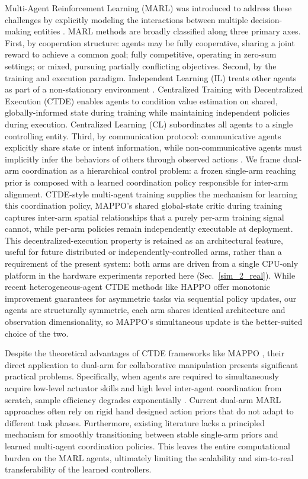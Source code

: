 \documentclass[a4paper,fleqn]{cas-dc}
\begin{document}
Multi-Agent Reinforcement Learning (MARL) was introduced to address these challenges by explicitly modeling the interactions between multiple decision-making entities \cite{intro-22}. MARL methods are broadly classified along three primary axes. First, by cooperation structure: agents may be fully cooperative, sharing a joint reward to achieve a common goal; fully competitive, operating in zero-sum settings; or mixed, pursuing partially conflicting objectives. Second, by the training and execution paradigm. Independent Learning (IL) treats other agents as part of a non-stationary environment \cite{IPPO}. Centralized Training with Decentralized Execution (CTDE) enables agents to condition value estimation on shared, globally-informed state during training while maintaining independent policies during execution. Centralized Learning (CL) subordinates all agents to a single controlling entity. Third, by communication protocol: communicative agents explicitly share state or intent information, while non-communicative agents must implicitly infer the behaviors of others through observed actions \cite{intro-23, intro-25}. We frame dual-arm coordination as a hierarchical control problem: a frozen single-arm reaching prior is composed with a learned coordination policy responsible for inter-arm alignment. CTDE-style multi-agent training supplies the mechanism for learning this coordination policy, MAPPO's shared global-state critic during training captures inter-arm spatial relationships that a purely per-arm training signal cannot, while per-arm policies remain independently executable at deployment. This decentralized-execution property is retained as an architectural feature, useful for future distributed or independently-controlled arms, rather than a requirement of the present system: both arms are driven from a single CPU-only platform in the hardware experiments reported here (Sec.~\ref{sim_2_real}). While recent heterogeneous-agent CTDE methods like HAPPO \cite{happo/htrpo} offer monotonic improvement guarantees for asymmetric tasks via sequential policy updates, our agents are structurally symmetric, each arm shares identical architecture and observation dimensionality, so MAPPO's simultaneous update is the better-suited choice of the two.

Despite the theoretical advantages of CTDE frameworks like MAPPO \cite{MAPPO}, their direct application to dual-arm for collaborative manipulation presents significant practical problems. Specifically, when agents are required to simultaneously acquire low-level actuator skills and high level inter-agent coordination from scratch, sample efficiency degrades exponentially \cite{intro-27}. Current dual-arm MARL approaches often rely on rigid hand designed action priors that do not adapt to different task phases. Furthermore, existing literature lacks a principled mechanism for smoothly transitioning between stable single-arm priors and learned multi-agent coordination policies. This leaves the entire computational burden on the MARL agents, ultimately limiting the scalability and sim-to-real transferability of the learned controllers.
\end{document}

